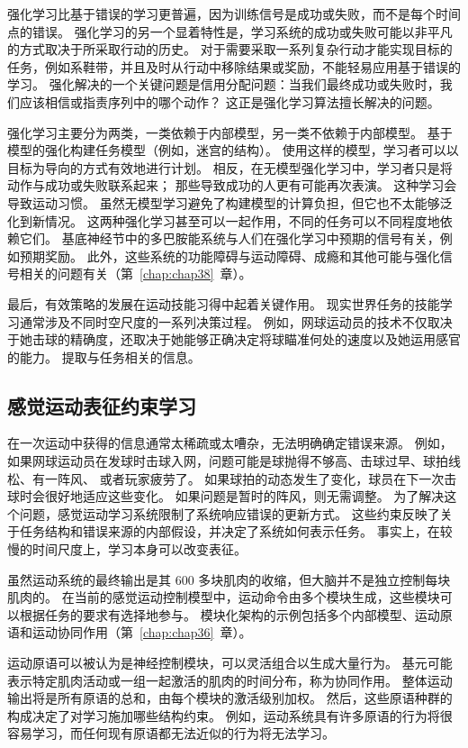 强化学习比基于错误的学习更普遍，因为训练信号是成功或失败，而不是每个时间点的错误。
强化学习的另一个显着特性是，学习系统的成功或失败可能以非平凡的方式取决于所采取行动的历史。
对于需要采取一系列复杂行动才能实现目标的任务，例如系鞋带，并且及时从行动中移除结果或奖励，不能轻易应用基于错误的学习。
强化解决的一个关键问题是信用分配问题：当我们最终成功或失败时，我们应该相信或指责序列中的哪个动作？
这正是强化学习算法擅长解决的问题。


强化学习主要分为两类，一类依赖于内部模型，另一类不依赖于内部模型。
基于模型的强化构建任务模型（例如，迷宫的结构）。
使用这样的模型，学习者可以以目标为导向的方式有效地进行计划。
相反，在无模型强化学习中，学习者只是将动作与成功或失败联系起来；
那些导致成功的人更有可能再次表演。
这种学习会导致运动习惯。
虽然无模型学习避免了构建模型的计算负担，但它也不太能够泛化到新情况。
这两种强化学习甚至可以一起作用，不同的任务可以不同程度地依赖它们。
基底神经节中的多巴胺能系统与人们在强化学习中预期的信号有关，例如预期奖励。
此外，这些系统的功能障碍与运动障碍、成瘾和其他可能与强化信号相关的问题有关（第~\ref{chap:chap38}~章）。


最后，有效策略的发展在运动技能习得中起着关键作用。
现实世界任务的技能学习通常涉及不同时空尺度的一系列决策过程。
例如，网球运动员的技术不仅取决于她击球的精确度，还取决于她能够正确决定将球瞄准何处的速度以及她运用感官的能力。
提取与任务相关的信息。



\subsection{感觉运动表征约束学习}

在一次运动中获得的信息通常太稀疏或太嘈杂，无法明确确定错误来源。
例如，如果网球运动员在发球时击球入网，问题可能是球抛得不够高、击球过早、球拍线松、有一阵风、 或者玩家疲劳了。
如果球拍的动态发生了变化，球员在下一次击球时会很好地适应这些变化。
如果问题是暂时的阵风，则无需调整。
为了解决这个问题，感觉运动学习系统限制了系统响应错误的更新方式。
这些约束反映了关于任务结构和错误来源的内部假设，并决定了系统如何表示任务。
事实上，在较慢的时间尺度上，学习本身可以改变表征。


虽然运动系统的最终输出是其 600 多块肌肉的收缩，但大脑并不是独立控制每块肌肉的。
在当前的感觉运动控制模型中，运动命令由多个模块生成，这些模块可以根据任务的要求有选择地参与。
模块化架构的示例包括多个内部模型、运动原语和运动协同作用（第~\ref{chap:chap36}~章）。


运动原语可以被认为是神经控制模块，可以灵活组合以生成大量行为。
基元可能表示特定肌肉活动或一组一起激活的肌肉的时间分布，称为协同作用。
整体运动输出将是所有原语的总和，由每个模块的激活级别加权。
然后，这些原语种群的构成决定了对学习施加哪些结构约束。
例如，运动系统具有许多原语的行为将很容易学习，而任何现有原语都无法近似的行为将无法学习。




